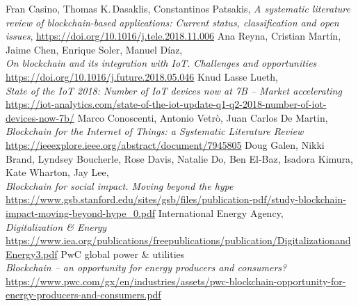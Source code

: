 \documentclass[11pt]{article}
\begin{document}
\pagebreak
\begin{thebibliography}{25}

	Fran Casino, Thomas K.\,Dasaklis, Constantinos Patsakis,
	\textit{A systematic literature review of blockchain-based applications: Current status, classification and open issues},
	\hyperref[https://doi.org/10.1016/j.tele.2018.11.006]{https://doi.org/10.1016/j.tele.2018.11.006}
	Ana Reyna, Cristian Martín, Jaime Chen, Enrique Soler, Manuel Díaz,\\
	\textit{On blockchain and its integration with IoT. Challenges and opportunities}\\
	\hyperref[https://doi.org/10.1016/j.future.2018.05.046]{https://doi.org/10.1016/j.future.2018.05.046}
	Knud Lasse Lueth,\\
	\textit{State of the IoT 2018: Number of IoT devices now at 7B – Market accelerating}\\
	\hyperref[https://iot-analytics.com/state-of-the-iot-update-q1-q2-2018-number-of-iot-devices-now-7b/]{https://iot-analytics.com/state-of-the-iot-update-q1-q2-2018-number-of-iot-devices-now-7b/}
	Marco Conoscenti, Antonio Vetrò, Juan Carlos De Martin,\\
	\textit{Blockchain for the Internet of Things: a Systematic Literature Review}\\
	\hyperref[https://ieeexplore.ieee.org/abstract/document/7945805]{https://ieeexplore.ieee.org/abstract/document/7945805}
	Doug Galen, Nikki Brand, Lyndsey Boucherle, Rose Davis, Natalie Do, Ben El-Baz, Isadora Kimura, Kate Wharton, Jay Lee,\\
	\textit{Blockchain for social impact. Moving beyond the hype}\\
	\hyperref[https://www.gsb.stanford.edu/sites/gsb/files/publication-pdf/study-blockchain-impact-moving-beyond-hype_0.pdf]{https://www.gsb.stanford.edu/sites/gsb/files/publication-pdf/study-blockchain-impact-moving-beyond-hype\_0.pdf}
	International Energy Agency,\\
	\textit{Digitalization \& Energy}\\
	\hyperref[https://www.iea.org/publications/freepublications/publication/DigitalizationandEnergy3.pdf]{https://www.iea.org/publications/freepublications/publication/DigitalizationandEnergy3.pdf}
	PwC global power \& utilities\\
	\textit{Blockchain – an opportunity for energy producers and consumers?}\\
	\hyperref[https://www.pwc.com/gx/en/industries/assets/pwc-blockchain-opportunity-for-energy-producers-and-consumers.pdf]{https://www.pwc.com/gx/en/industries/assets/pwc-blockchain-opportunity-for-energy-producers-and-consumers.pdf}

\end{thebibliography}
\end{document}
